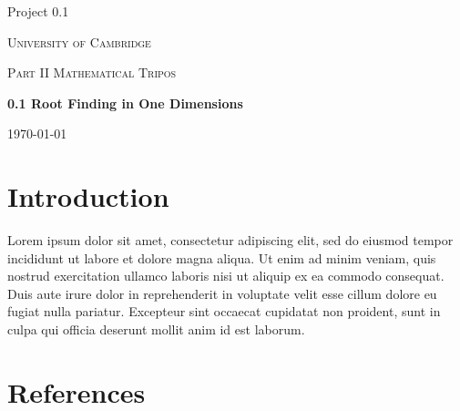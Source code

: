 \documentclass{article}
\begin{document}
    \begin{titlepage}
        \begin{flushleft}
            Project 0.1
        \end{flushleft}
        \vfill
        \centering
        {\scshape\LARGE University of Cambridge \par}
        \vspace{1cm}
        {\scshape\Large Part II Mathematical Tripos \par}
        \vspace{1.5cm}
        {\huge\bfseries 0.1 Root Finding in One Dimensions \par}
        \vspace{2cm}

        \vfill
        {\large \today\par}
    \end{titlepage}
  
  \section{Introduction}
  
  Lorem ipsum dolor sit amet, consectetur adipiscing elit, sed do eiusmod tempor incididunt ut labore et dolore magna aliqua. Ut enim ad minim veniam, quis nostrud exercitation ullamco laboris nisi ut aliquip ex ea commodo consequat. Duis aute irure dolor in reprehenderit in voluptate velit esse cillum dolore eu fugiat nulla pariatur. Excepteur sint occaecat cupidatat non proident, sunt in culpa qui officia deserunt mollit anim id est laborum. \cite{xu}

  \newpage
  \clearpage
  \section{References}
  \begingroup
    \renewcommand{\section}[2]{}
    
    
  \endgroup
  
  
\end{document}
